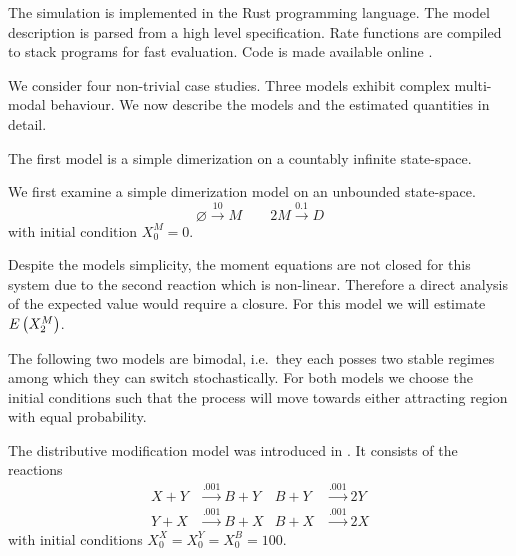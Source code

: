 The simulation is implemented in the Rust programming language.
The model description is parsed from a high level specification. 
Rate functions are compiled to stack programs for fast evaluation.
Code is made available online \parencite{cme-simulation-github}.

We consider four non-trivial case studies. Three models exhibit complex multi-modal behaviour.
We now describe the models and the estimated quantities in detail.

The first model is a simple dimerization on a countably infinite state-space.
\begin{model*}[Dimerization]
We first examine a simple dimerization model on an unbounded state-space.
	\[\varnothing\xrightarrow{10}M\qquad 2M\xrightarrow{0.1}D\]
with initial condition $X_0^M=0$.
\end{model*}
Despite the models simplicity, the moment equations are not closed for this system
due to the second reaction which is non-linear.
Therefore a direct analysis of the expected value would require a closure.
For this model we will estimate ${E}\left(X^M_2\right)$.

The following two models are bimodal, i.e.\ they each posses two stable regimes
among which they can switch stochastically.
For both models we choose the initial conditions such that the process
will move towards either attracting region with equal probability.
\begin{model}\label{model:dm}
The distributive modification model was introduced in \citet{cardelli2012cell}.
It consists of the reactions
\begin{align*}
	X + Y &\xrightarrow{\num{.001}} B + Y &
	B + Y &\xrightarrow{\num{.001}} 2 Y\\
	Y + X &\xrightarrow{\num{.001}} B + X &
	B + X &\xrightarrow{\num{.001}} 2 X
\end{align*}
with initial conditions $X^X_0=X^Y_0=X^B_0=100$.
\end{model}


